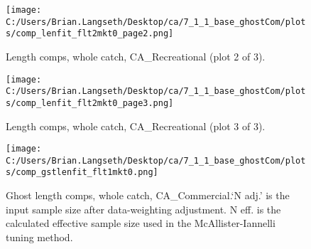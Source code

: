 \documentclass[11pt,
  english,
  a4paper,
]{article}
\begin{document}
\tagmcend\tagstructend


\begin{figure}
\centering
\texttt{[image: C:/Users/Brian.Langseth/Desktop/ca/7\_1\_1\_base\_ghostCom/plots/comp\_lenfit\_flt2mkt0\_page2.png]}
\caption{Length comps, whole catch, CA\_Recreational (plot 2 of 3).\label{fig:comp_lenfit_flt2mkt0_page2}}
\end{figure}

\tagmcend\tagstructend


\begin{figure}
\centering
\texttt{[image: C:/Users/Brian.Langseth/Desktop/ca/7\_1\_1\_base\_ghostCom/plots/comp\_lenfit\_flt2mkt0\_page3.png]}
\caption{Length comps, whole catch, CA\_Recreational (plot 3 of 3).\label{fig:comp_lenfit_flt2mkt0_page3}}
\end{figure}

\tagmcend\tagstructend


\begin{figure}
\centering
\texttt{[image: C:/Users/Brian.Langseth/Desktop/ca/7\_1\_1\_base\_ghostCom/plots/comp\_gstlenfit\_flt1mkt0.png]}
\caption{Ghost length comps, whole catch, CA\_Commercial.`N adj.' is the input sample size after data-weighting adjustment. N eff. is the calculated effective sample size used in the McAllister-Iannelli tuning method.\label{fig:comp_gstlenfit_flt1mkt0}}
\end{figure}

\tagmcend\tagstructend

\clearpage
\end{document}

